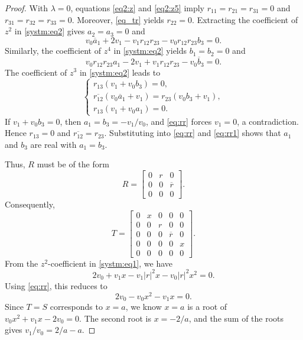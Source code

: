 \documentclass[12pt, reqno]{amsart}
\theoremstyle{definition}
\theoremstyle{remark}
\numberwithin{equation}{section}
\begin{document}
\begin{proof}
	With $\lambda=0$, equations \eqref{eq2:z} and \eqref{eq2:z5} imply $r_{11} = r_{21} = r_{31} = 0$ and $r_{31} = r_{32} = r_{33} = 0$. Moreover, \eqref{eq_tr} yields $r_{22} = 0$.
	Extracting the coefficient of $z^2$ in \eqref{systm:eq2} gives $a_2 = a_3 = 0$ and
	\begin{equation}\label{eq:rr}
		v_0 \overline{a}_1 + 2v_1 - v_1 r_{12} r_{23} - v_0 r_{12} r_{23} b_3 = 0.
	\end{equation}
	Similarly, the coefficient of $z^4$ in \eqref{systm:eq2} yields $b_1 = b_2 = 0$ and
	\begin{equation}\label{eq:rr1}
		v_0 r_{12} r_{23} a_1 - 2v_1 + v_1 r_{12} r_{23} - v_0 \overline{b}_3 = 0.
	\end{equation}
	The coefficient of $z^3$ in \eqref{systm:eq2} leads to
	\begin{equation} 
		\begin{cases}
			r_{13}(v_1 + v_0 b_3) = 0,\\
			\overline{r_{12}}(v_0 \overline{a}_1 + v_1) = r_{23}(v_0 b_3 + v_1),\\
			r_{13}(v_1 + v_0 a_1) = 0.
		\end{cases} 
	\end{equation}
	If $v_1 + v_0 b_3 = 0$, then $a_1 = b_3 = -v_1/v_0$, and \eqref{eq:rr} forces $v_1 = 0$, a contradiction. Hence $r_{13} = 0$ and $\overline{r_{12}} = r_{23}$. Substituting into \eqref{eq:rr} and \eqref{eq:rr1} shows that $a_1$ and $b_3$ are real with $a_1 = b_3$.
	
	Thus, $R$ must be of the form
	\[
	R = \begin{bmatrix} 
		0 & r & 0 \\
		0 & 0 & \overline{r} \\ 
		0 & 0 & 0
	\end{bmatrix}.
	\]
	Consequently,
	\begin{equation}\label{truncated shift_T}
		T = \begin{bmatrix}
			0 & x & 0 & 0 & 0\\
			0 & 0 & r & 0 & 0\\
			0 & 0 & 0 & \overline{r} & 0 \\
			0 & 0 & 0 & 0 & x\\
			0 & 0 & 0 & 0 & 0
		\end{bmatrix}.
	\end{equation} 
	From the $z^2$-coefficient in \eqref{systm:eq1}, we have 
	\[
	2v_0 + v_1 x - v_1 |r|^2 x - v_0 |r|^2 x^2 = 0.
	\]   
	Using \eqref{eq:rr}, this reduces to
	\[
	2v_0 - v_0 x^2 - v_1 x = 0.
	\] 
	Since $T=S$ corresponds to $x=a$, we know $x=a$ is a root of $v_0 x^2 + v_1 x - 2v_0 = 0$. The second root is $x=-2/a$, and the sum of the roots gives $v_1/v_0 = 2/a - a$.
	

\end{proof}
\end{document}
